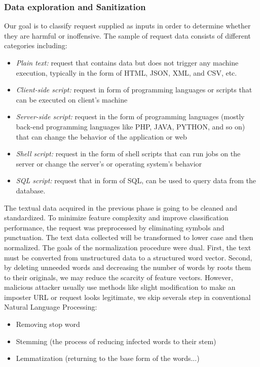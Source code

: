 \subsubsection{Data exploration and Sanitization}
\label{data preprocessed}
Our goal is to classify request supplied as inputs in order to determine whether they are harmful or inoffensive. The sample of request data consists of different categories including: 
\begin{itemize}
    \item \emph{Plain text:} request that contains data but does not trigger any machine execution, typically in the form of HTML, JSON, XML, and CSV, etc.
    \item \emph{Client-side script:} request in form of programming languages or scripts that can be executed on client's machine
    \item \emph{Server-side script:} request in the form of programming languages (mostly back-end programming languages like PHP, JAVA, PYTHON, and so on) that can change the behavior of the application or web
    \item \emph{Shell script:} request in the form of shell scripts that can run jobs on the server or change the server's or operating system's behavior
    \item \emph{SQL script:} request that in form of SQL, can be used to query data from the database.
\end{itemize}
 The textual data acquired in the previous phase is going to be cleaned and standardized. To minimize feature complexity and improve classification performance, the request was preprocessed by eliminating symbols and punctuation. The text data collected will be transformed to lower case and then normalized. The goals of the normalization procedure were dual. First, the text must be converted from unstructured data to a structured word vector. Second, by deleting unneeded words and decreasing the number of words by roots them to their originals, we may reduce the scarcity of feature vectors.
However, malicious attacker usually use methods like slight modification to make an imposter URL or request looks legitimate, we skip severals step in conventional Natural Language Processing: 
\begin{itemize}
    \item Removing stop word
    \item Stemming (the process of reducing infected words to their stem)
    \item Lemmatization (returning to the base form of the words...)

\end{itemize}
